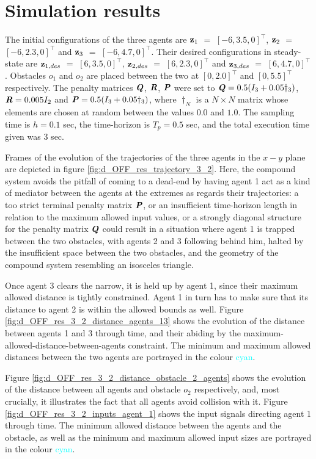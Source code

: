 \section{Simulation results}

The initial configurations of the three agents are
$\bm{\mathbf{z}}_1$ $=$ $[-6, 3.5, 0]^{\top}$,
$\bm{\mathbf{z}}_2$ $=$ $[-6, 2.3, 0]^{\top}$ and
$\bm{\mathbf{z}}_3$ $=$ $[-6, 4.7, 0]^{\top}$.
Their desired configurations in steady-state are
$\bm{\mathbf{z}}_{1,des}$ $=$ $[6, 3.5, 0]^{\top}$,
$\bm{\mathbf{z}}_{2,des}$ $=$ $[6, 2.3, 0]^{\top}$ and
$\bm{\mathbf{z}}_{3,des}$ $=$ $[6, 4.7, 0]^{\top}$.
Obstacles $o_1$ and $o_2$ are placed between the two at $[0, 2.0]^{\top}$
and $[0, 5.5]^{\top}$ respectively. The penalty
matrices $\bm{\mathit{Q}}$, $\bm{\mathit{R}}$, $\bm{\mathit{P}}$ were set to
$\bm{\mathit{Q}} = 0.5 (I_3 + 0.05\dagger_3)$, $\bm{\mathit{R}} = 0.005 I_2$ and
$\bm{\mathit{P}} = 0.5 (I_3 + 0.05\dagger_3)$, where $\dagger_N$ is a $N \times N$
matrix whose elements are chosen at random between the values $0.0$ and $1.0$.
The sampling time is $h = 0.1$ sec, the time-horizon is $T_p = 0.5$ sec, and
the total execution time given was $3$ sec.

Frames of the evolution of the trajectories of the three agents in the $x-y$
plane are depicted in figure \eqref{fig:d_OFF_res_trajectory_3_2}. Here, the
compound system avoids the pitfall of coming to a dead-end by having agent 1
act as a kind of mediator between the agents at the extremes as regards their
trajectories: a too strict terminal penalty matrix $\bm{\mathit{P}}$, or an insufficient
time-horizon length in relation to the maximum allowed input values, or a
strongly diagonal structure for the penalty matrix $\bm{\mathit{Q}}$ could result in
a situation where agent 1 is trapped between the two obstacles, with agents 2
and 3 following behind him, halted by the insufficient space between the two
obstacles, and the geometry of the compound system resembling an isosceles
triangle.

Once agent 3 clears the narrow, it is held up by agent 1, since their
maximum allowed distance is tightly constrained. Agent 1 in turn has to make
sure that its distance to agent 2 is within the allowed bounds as well. Figure
\eqref{fig:d_OFF_res_3_2_distance_agents_13} shows the evolution of the
distance between agents 1 and 3 through time, and their abiding by the
maximum-allowed-distance-between-agents constraint. The minimum and maximum
allowed distances between the two agents are portrayed in the
colour \textcolor{cyan}{cyan}.

Figure \eqref{fig:d_OFF_res_3_2_distance_obstacle_2_agents} shows the
evolution of the distance between all agents and obstacle $o_2$ respectively,
and, most crucially, it illustrates the fact that all agents avoid collision
with it. Figure \eqref{fig:d_OFF_res_3_2_inputs_agent_1} shows the input signals
directing agent 1 through time. The minimum allowed distance between the agents
and the obstacle, as well as the minimum and maximum allowed input sizes are
portrayed in the colour \textcolor{cyan}{cyan}.

